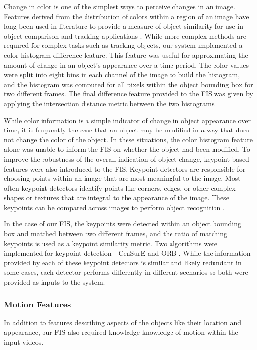 \documentclass[12pt]{report}
\begin{document}
Change in color is one of the simplest ways to perceive changes in an image. Features derived from the distribution of colors within a region of an image have long been used in literature to provide a measure of object similarity for use in object comparison and tracking applications \cite{Swain1991ColorIndexing, Chang1999ObjectHistograms, Wang2007AdaptiveFilter, Zivkovic2004AnTracking}. While more complex methods are required for complex tasks such as tracking objects, our system implemented a color histogram difference feature. This feature was useful for approximating the amount of change in an object's appearance over a time period. The color values were split into eight bins in each channel of the image to build the histogram, and the histogram was computed for all pixels within the object bounding box for two different frames. The final difference feature provided to the FIS was given by applying the intersection distance metric between the two histograms.

While color information is a simple indicator of change in object appearance over time, it is frequently the case that an object may be modified in a way that does not change the color of the object. In these situations, the color histogram feature alone was unable to inform the FIS on whether the object had been modified. To improve the robustness of the overall indication of object change, keypoint-based features were also introduced to the FIS. Keypoint detectors are responsible for choosing points within an image that are most meaningful to the image. Most often keypoint detectors identify points like corners, edges, or other complex shapes or textures that are integral to the appearance of the image. These keypoints can be compared across images to perform object recognition \cite{Oji2012AnKeypoints, Nowak2014SpatialRetrieval}. 

In the case of our FIS, the keypoints were detected within an object bounding box and matched between two different frames, and the ratio of matching keypoints is used as a keypoint similarity metric. Two algorithms were implemented for keypoint detection - CenSurE \cite{Agrawal2008Censure:Matching} and ORB \cite{Rublee2011ORB:SURF}. While the information provided by each of these keypoint detectors is similar and likely redundant in some cases, each detector performs differently in different scenarios so both were provided as inputs to the system.

\subsubsection{Motion Features}
In addition to features describing aspects of the objects like their location and appearance, our FIS also required knowledge knowledge of motion within the input videos.
\end{document}
